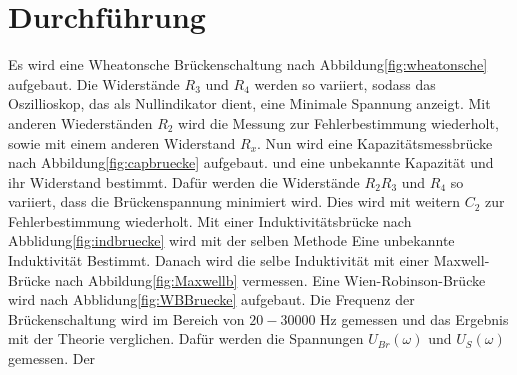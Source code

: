 \section{Durchführung}
\label{sec:Durchführung}
Es wird eine Wheatonsche Brückenschaltung nach Abbildung\ref{fig:wheatonsche}
aufgebaut. Die Widerstände $R_3$ und $R_4$ werden so variiert, sodass das
Oszillioskop, das als Nullindikator dient, eine Minimale Spannung anzeigt.
Mit anderen Wiederständen $R_2$ wird die Messung zur Fehlerbestimmung wiederholt,
sowie mit einem anderen Widerstand $R_x$.
Nun wird eine Kapazitätsmessbrücke nach Abbildung\ref{fig:capbruecke} aufgebaut.
und eine unbekannte Kapazität und ihr Widerstand bestimmt. Dafür werden die
Widerstände $R_2R_3$ und $R_4$ so variiert, dass die Brückenspannung minimiert
wird. Dies wird mit weitern $C_2$ zur Fehlerbestimmung wiederholt. Mit einer
Induktivitätsbrücke nach Abblidung\ref{fig:indbruecke} wird mit der selben Methode
Eine unbekannte Induktivität Bestimmt. Danach wird die selbe Induktivität mit einer
Maxwell-Brücke nach Abbildung\ref{fig:Maxwellb} vermessen. Eine Wien-Robinson-Brücke
wird nach Abblidung\ref{fig:WBBruecke} aufgebaut. Die Frequenz der Brückenschaltung
wird im Bereich von $20-30000$ Hz gemessen und das Ergebnis mit der Theorie
verglichen. Dafür werden die Spannungen $U_{Br}(\omega)$ und $U_{S}(\omega)$
gemessen. Der 
